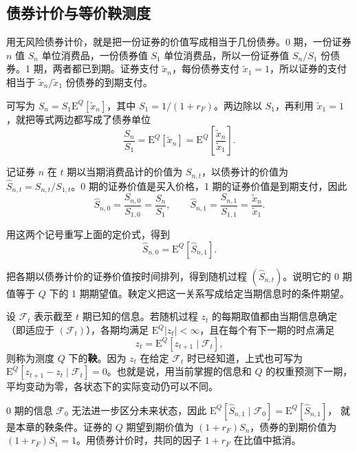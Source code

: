 \subsection{债券计价与等价鞅测度}
用无风险债券计价，就是把一份证券的价值写成相当于几份债券。0 期，一份证券 $n$ 值 $S_n$ 单位消费品，一份债券值 $S_1$ 单位消费品，所以一份证券值 $S_n/S_1$ 份债券。1 期，两者都已到期。证券支付 $\tilde x_n$，每份债券支付 $\tilde x_1=1$，所以证券的支付相当于 $\tilde x_n/\tilde x_1$ 份债券的到期支付。

 可写为 $S_n=S_1\mathrm E^Q[\tilde x_n]$，其中 $S_1=1/(1+r_F)$。两边除以 $S_1$，再利用 $\tilde x_1=1$，就把等式两边都写成了债券单位
\[
 \frac{S_n}{S_1}=\mathrm E^Q[\tilde x_n]
 =\mathrm E^Q\!\left[\frac{\tilde x_n}{\tilde x_1}\right].
\]

\begin{tcolorbox}[knowledge,title=债券计价与价格的鞅关系]
记证券 $n$ 在 $t$ 期以当期消费品计的价值为 $S_{n,t}$，以债券计的价值为 $\hat S_{n,t}=S_{n,t}/S_{1,t}$。0 期的证券价值是买入价格，1 期的证券价值是到期支付，因此
\[
 \hat S_{n,0}=\frac{S_{n,0}}{S_{1,0}}=\frac{S_n}{S_1},
 \qquad
 \hat S_{n,1}=\frac{S_{n,1}}{S_{1,1}}=\frac{\tilde{x}_n}{\tilde{x}_1}.
\]

用这两个记号重写上面的定价式，得到
\begin{equation}
    \hat{S}_{n,0}=\mathrm{E}^{Q}[\hat{S}_{n,1}].
 \label{eq:wj-four-10}
\end{equation}
\end{tcolorbox}

把各期以债券计价的证券价值按时间排列，得到随机过程 $(\hat S_{n,t})$。说明它的 0 期值等于 $Q$ 下的 1 期期望值。鞅定义把这一关系写成给定当期信息时的条件期望。

\begin{tcolorbox}[knowledge]
设 $\mathcal F_t$ 表示截至 $t$ 期已知的信息。若随机过程 $z_t$ 的每期取值都由当期信息确定（即适应于 $(\mathcal F_t)$），各期均满足 $\mathrm E^Q|z_t|<\infty$，且在每个有下一期的时点满足
\[
 z_t=\mathrm E^Q[z_{t+1}\mid\mathcal F_t],
\]
则称为测度 $Q$ 下的\textbf{鞅}。因为 $z_t$ 在给定 $\mathcal F_t$ 时已经知道，上式也可写为 $\mathrm E^Q[z_{t+1}-z_t\mid\mathcal F_t]=0$。也就是说，用当前掌握的信息和 $Q$ 的权重预测下一期，平均变动为零，各状态下的实际变动仍可以不同。
\end{tcolorbox}

0 期的信息 $\mathcal F_0$ 无法进一步区分未来状态，因此 $\mathrm E^Q[\hat S_{n,1}\mid\mathcal F_0]=\mathrm E^Q[\hat S_{n,1}]$， 就是本章的鞅条件。证券的 $Q$ 期望到期价值为 $(1+r_F)S_n$，债券的到期价值为 $(1+r_F)S_1=1$。用债券计价时，共同的因子 $1+r_F$ 在比值中抵消。

